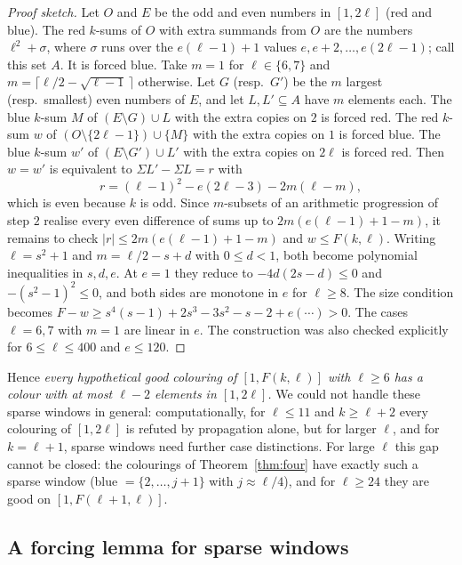 \documentclass[11pt]{amsart}
\theoremstyle{definition}
\newcommand{\F}{F}
\begin{document}
\begin{proof}[Proof sketch]
Let $O$ and $E$ be the odd and even numbers in $[1,2\ell]$ (red and blue). The red $k$-sums of $O$ with extra summands from $O$ are the numbers $\ell^2+\sigma$, where $\sigma$ runs over the $e(\ell-1)+1$ values $e,e+2,\dots,e(2\ell-1)$; call this set $A$. It is forced blue. Take $m=1$ for $\ell\in\{6,7\}$ and $m=\lceil\ell/2-\sqrt{\ell-1}\,\rceil$ otherwise. Let $G$ (resp.\ $G'$) be the $m$ largest (resp.\ smallest) even numbers of $E$, and let $L,L'\subseteq A$ have $m$ elements each. The blue $k$-sum $M$ of $(E\setminus G)\cup L$ with the extra copies on $2$ is forced red. The red $k$-sum $w$ of $(O\setminus\{2\ell-1\})\cup\{M\}$ with the extra copies on $1$ is forced blue. The blue $k$-sum $w'$ of $(E\setminus G')\cup L'$ with the extra copies on $2\ell$ is forced red. Then $w=w'$ is equivalent to $\Sigma L'-\Sigma L=r$ with
\[
r=(\ell-1)^2-e(2\ell-3)-2m(\ell-m),
\]
which is even because $k$ is odd. Since $m$-subsets of an arithmetic progression of step $2$ realise every even difference of sums up to $2m(e(\ell-1)+1-m)$, it remains to check $|r|\le2m(e(\ell-1)+1-m)$ and $w\le\F(k,\ell)$. Writing $\ell=s^2+1$ and $m=\ell/2-s+d$ with $0\le d<1$, both become polynomial inequalities in $s,d,e$. At $e=1$ they reduce to $-4d(2s-d)\le0$ and $-(s^2-1)^2\le0$, and both sides are monotone in $e$ for $\ell\ge8$. The size condition becomes $\F-w\ge s^4(s-1)+2s^3-3s^2-s-2+e(\cdots)>0$. The cases $\ell=6,7$ with $m=1$ are linear in $e$. The construction was also checked explicitly for $6\le\ell\le400$ and $e\le120$.
\end{proof}

\noindent Hence \emph{every hypothetical good colouring of $[1,\F(k,\ell)]$ with $\ell\ge6$ has a colour with at most $\ell-2$ elements in $[1,2\ell]$.} We could not handle these sparse windows in general: computationally, for $\ell\le11$ and $k\ge\ell+2$ every colouring of $[1,2\ell]$ is refuted by propagation alone, but for larger $\ell$, and for $k=\ell+1$, sparse windows need further case distinctions. For large $\ell$ this gap cannot be closed: the colourings of Theorem~\ref{thm:four} have exactly such a sparse window (blue $=\{2,\dots,j+1\}$ with $j\approx\ell/4$), and for $\ell\ge24$ they are good on $[1,\F(\ell+1,\ell)]$.

\subsection*{A forcing lemma for sparse windows}
\end{document}
